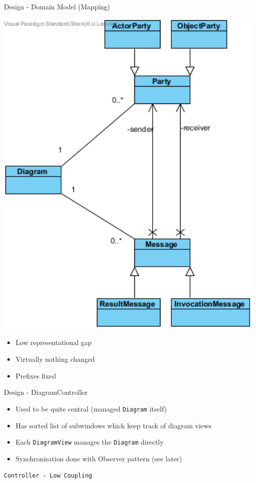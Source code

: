 \documentclass[10pt]{beamer}
\begin{document}
\begin{frame}[fragile]{Design - Domain Model (Mapping)}
\noindent\begin{minipage}{0.5\textwidth}%
\includegraphics[width=1\textwidth]{domain}
\end{minipage}%
\hfill%
\begin{minipage}{0.5\textwidth}\raggedleft
\begin{itemize}
	\item Low representational gap
	\item Virtually nothing changed
	\item Prefixes fixed
	\end{itemize}
\end{minipage}
\end{frame}

\begin{frame}[fragile]{Design - DiagramController}
\begin{itemize}
\item Used to be quite central (managed \texttt{Diagram} itself)
\item Has sorted list of subwindows which keep track of diagram views
\item Each \texttt{DiagramView} manages the \texttt{Diagram} directly
\item Synchronisation done with Observer pattern (see later)
\end{itemize}
\begin{center}
\vspace{1cm}
\texttt{Controller - Low Coupling}
\end{center}
\end{frame}
\end{document}
